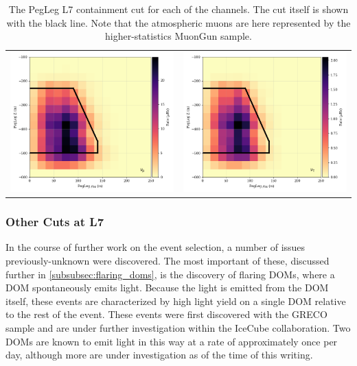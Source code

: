 \begin{center}
\begin{table}
\begin{tabular}{cc}
    \includegraphics[width=0.45\linewidth]{pegleg_z_rho_genie_numu.png} &  
    \includegraphics[width=0.45\linewidth]{pegleg_z_rho_genie_nutau.png} \\ 
\end{tabular}
\label{fig:pegleg_zVsRho}
\caption{The PegLeg L7 containment cut for each of the channels. The cut itself is shown with the black line. Note that the atmospheric muons are here represented by the higher-statistics MuonGun sample.}
\end{table}
\end{center}

\label{subsubsec:other_l7_cuts}
\subsubsection{Other Cuts at L7}
In the course of further work on the event selection, a number of issues previously-unknown were discovered.
The most important of these, discussed further in \ref{subsubsec:flaring_doms}, is the discovery of flaring DOMs, where a DOM spontaneously emits light.
Because the light is emitted from the DOM itself, these events are characterized by high light yield on a single DOM relative to the rest of the event.
These events were first discovered with the GRECO sample and are under further investigation within the IceCube collaboration.
Two DOMs are known to emit light in this way at a rate of approximately once per day, although more are under investigation as of the time of this writing. 

